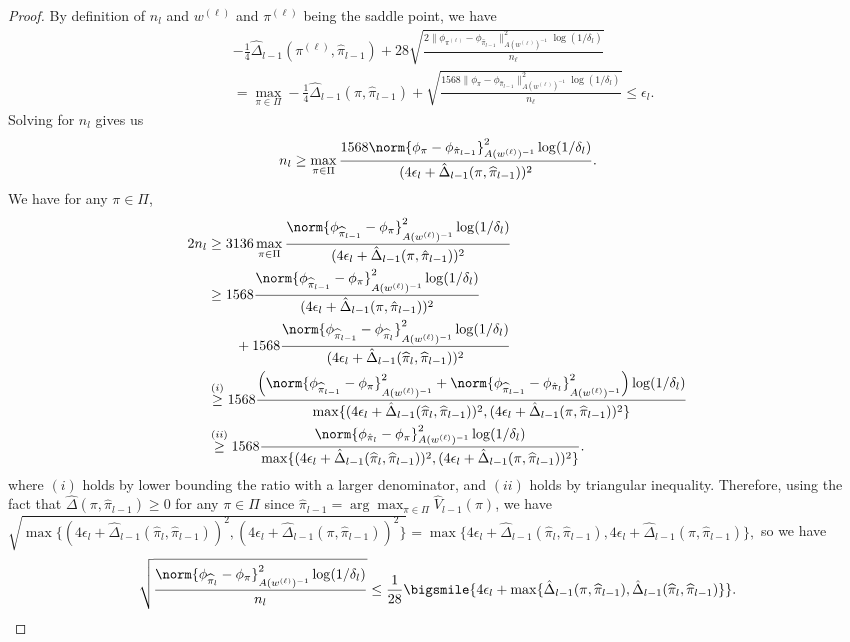 \documentclass{article}
\newcommand{\kevin}[1]{\textcolor{red}{KGJ:#1}}
\newcommand{\pil}{\widehat{\pi}_{l}}
\newcommand{\pill}{\widehat{\pi}_{l-1}}
\newcommand{\1}{\mathbf{1}}
\begin{document}
\begin{proof}
By definition of $n_l$ and $w^{(\ell)}$ and $\pi^{(\ell)}$ being the saddle point, we have
\begin{align*}
    &-\frac{1}{4}\hat{\Delta}_{l-1}(\pi^{(\ell)},\pill)+28\sqrt{ \frac{2\| \phi_{\pi^{(\ell)}} - \phi_{\pill} \|_{A(w^{(\ell)})^{-1}}^2 \log(1/\delta_l )}{n_\ell}}\\
    &=\max_{\pi\in\Pi}-\frac{1}{4}\hat{\Delta}_{l-1}(\pi,\pill)+\sqrt{ \frac{1568\| \phi_{\pi} - \phi_{\pill} \|_{A(w^{(\ell)})^{-1}}^2 \log(1/\delta_l )}{n_\ell}}\leq \epsilon_l.
\end{align*}
Solving for $n_l$ gives us 
\begin{equation*}
    n_l\geq \max_{\pi\in\Pi}\frac{1568\norm{\phi_{\pi}-\phi_{\hat{\pi}_{l-1}}}_{A(w^{(\ell)})^{-1}}^2\log(1/\delta_l)}{(4\epsilon_l+\hat{\Delta}_{l-1}(\pi,\pill))^2}.
\end{equation*}
We have for any $\pi\in\Pi$, 
\begin{align*}
    2n_l &\geq 3136 \max_{\pi\in\Pi}\frac{\norm{\phi_{\pill}-\phi_{\pi}}_{A(w^{(\ell)})^{-1}}^2\log(1/\delta_l)}{(4\epsilon_l+\hat{\Delta}_{l-1}(\pi,\hat{\pi}_{l-1}))^2}\\
    &\geq 1568\frac{\norm{\phi_{\pill}-\phi_{\pi}}_{A(w^{(\ell)})^{-1}}^2\log(1/\delta_l)}{(4\epsilon_{l}+\hat{\Delta}_{l-1}(\pi,\hat{\pi}_{l-1}))^2}\\
    &\qquad+1568\frac{\norm{\phi_{\pill}-\phi_{\pil}}_{A(w^{(\ell)})^{-1}}^2\log(1/\delta_l)}{(4\epsilon_{l}+\hat{\Delta}_{l-1}(\pil,\pill))^2}\\
    &\overset{(i)}{\geq} 1568\frac{\Big(\norm{\phi_{\pill}-\phi_{\pi}}_{A(w^{(\ell)})^{-1}}^2+\norm{\phi_{\pill}-\phi_{\hat{\pi}_l}}_{A(w^{(\ell)})^{-1}}^2\Big)\log(1/\delta_l)}{\max\{(4\epsilon_{l}+\hat{\Delta}_{l-1}(\pil,\pill))^2, (4\epsilon_{l}+\hat{\Delta}_{l-1}(\pi,\pill))^2\}}\\
    &\overset{(ii)}{\geq} 1568\frac{\norm{\phi_{\hat{\pi}_{l}}-\phi_{\pi}}_{A(w^{(\ell)})^{-1}}^2\log(1/\delta_l)}{\max\{(4\epsilon_{l}+\hat{\Delta}_{l-1}(\pil,\pill))^2, (4\epsilon_{l}+\hat{\Delta}_{l-1}(\pi,\pill))^2\}}.
\end{align*}
where $(i)$ holds by lower bounding the ratio with a larger denominator, and $(ii)$ holds by triangular inequality. Therefore, using the fact that $\hat{\Delta}(\pi,\pill)\geq 0$ for any $\pi\in\Pi$ since $\pill=\arg\max_{\pi\in\Pi}\hat{V}_{l-1}(\pi)$, we have $\textstyle\sqrt{\max\{(4\epsilon_{l}+\hat{\Delta}_{l-1}(\pil,\pill))^2, (4\epsilon_{l}+\hat{\Delta}_{l-1}(\pi,\pill))^2\}}=\max\{4\epsilon_{l}+\hat{\Delta}_{l-1}(\pil,\pill), 4\epsilon_{l}+\hat{\Delta}_{l-1}(\pi,\pill)\},$ so we have
\[\sqrt{\frac{\norm{\phi_{\pil}-\phi_{\pi}}_{A(w^{(\ell)})^{-1}}^2\log(1/\delta_l)}{n_{l}}}\leq \frac{1}{28}\bigsmile{4\epsilon_{l}+\max\{\hat{\Delta}_{l-1}(\pi,\pill),\hat{\Delta}_{l-1}(\pil,\pill)\}}.\]
\end{proof}
\end{document}
